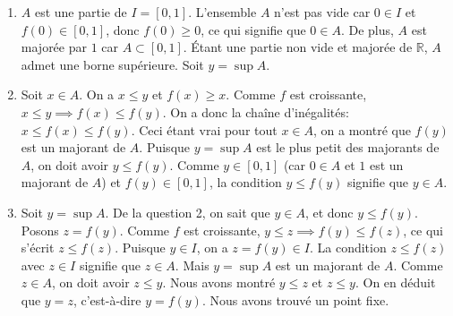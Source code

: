 \documentclass[solutions]{exercices}
\begin{document}
\begin{solution}
\begin{enumerate}
    \item $A$ est une partie de $I=[0,1]$. L'ensemble $A$ n'est pas vide car $0 \in I$ et $f(0) \in [0,1]$, donc $f(0) \ge 0$, ce qui signifie que $0 \in A$. De plus, $A$ est majorée par $1$ car $A \subset [0,1]$. Étant une partie non vide et majorée de $\mathbb{R}$, $A$ admet une borne supérieure. Soit $y = \sup A$.
    \item Soit $x \in A$. On a $x \le y$ et $f(x) \ge x$. Comme $f$ est croissante, $x \le y \implies f(x) \le f(y)$.
    On a donc la chaîne d'inégalités: $x \le f(x) \le f(y)$.
    Ceci étant vrai pour tout $x \in A$, on a montré que $f(y)$ est un majorant de $A$.
    Puisque $y=\sup A$ est le plus petit des majorants de $A$, on doit avoir $y \le f(y)$.
    Comme $y \in [0,1]$ (car $0\in A$ et $1$ est un majorant de $A$) et $f(y) \in [0,1]$, la condition $y \le f(y)$ signifie que $y \in A$.
    \item Soit $y=\sup A$. De la question 2, on sait que $y \in A$, et donc $y \le f(y)$.
    Posons $z = f(y)$. Comme $f$ est croissante, $y \le z \implies f(y) \le f(z)$, ce qui s'écrit $z \le f(z)$.
    Puisque $y \in I$, on a $z=f(y) \in I$. La condition $z \le f(z)$ avec $z \in I$ signifie que $z \in A$.
    Mais $y = \sup A$ est un majorant de $A$. Comme $z \in A$, on doit avoir $z \le y$.
    Nous avons montré $y \le z$ et $z \le y$. On en déduit que $y=z$, c'est-à-dire $y=f(y)$. Nous avons trouvé un point fixe.
\end{enumerate}
\end{solution}
\end{document}
